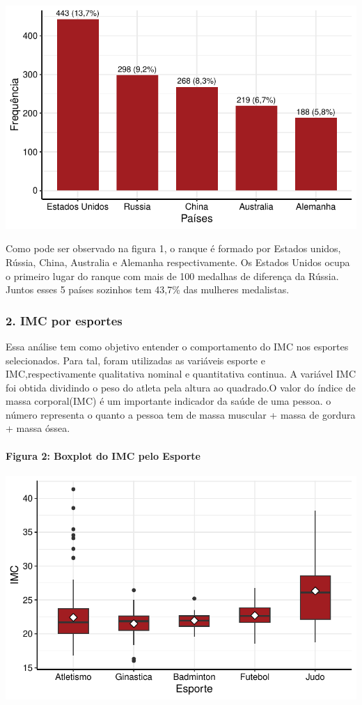 \documentclass[
  letterpaper,
  DIV=11,
  numbers=noendperiod]{scrartcl}
\let\oldparagraph\paragraph
\renewcommand{\paragraph}[1]{\oldparagraph{#1}\mbox{}}
\begin{document}
\includegraphics{Relatorio-projeto-fantasma_files/figure-pdf/unnamed-chunk-2-1.pdf}

Como pode ser observado na figura 1, o ranque é formado por Estados
unidos, Rússia, China, Australia e Alemanha respectivamente. Os Estados
Unidos ocupa o primeiro lugar do ranque com mais de 100 medalhas de
diferença da Rússia. Juntos esses 5 países sozinhos tem 43,7\% das
mulheres medalistas.

\subsubsection{2. IMC por esportes}\label{imc-por-esportes}

Essa análise tem como objetivo entender o comportamento do IMC nos
esportes selecionados. Para tal, foram utilizadas as variáveis esporte e
IMC,respectivamente qualitativa nominal e quantitativa continua. A
variável IMC foi obtida dividindo o peso do atleta pela altura ao
quadrado.O valor do índice de massa corporal(IMC) é um importante
indicador da saúde de uma pessoa. o número representa o quanto a pessoa
tem de massa muscular + massa de gordura + massa óssea.

\paragraph{Figura 2: Boxplot do IMC pelo
Esporte}\label{figura-2-boxplot-do-imc-pelo-esporte}

\includegraphics{Relatorio-projeto-fantasma_files/figure-pdf/unnamed-chunk-3-1.pdf}
\end{document}
